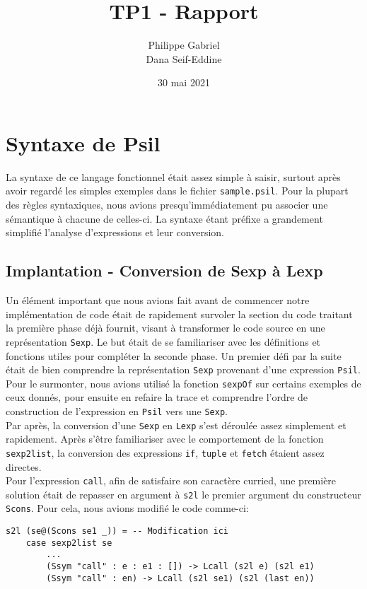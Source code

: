 \documentclass[11pt, titlepage]{article}
\begin{document}
\title{{\Huge \textbf{TP1 - Rapport}}}
\author{Philippe Gabriel \\ Dana Seif-Eddine}
\date{30 mai 2021}

\onehalfspacing

\maketitle

\setcounter{page}{2}

\newpage

\section{Syntaxe de Psil}

La syntaxe de ce langage fonctionnel était assez simple à saisir, surtout
après avoir regardé les simples exemples dans le fichier \texttt{sample.psil}.
Pour la plupart des règles syntaxiques, nous avions presqu'immédiatement pu
associer une sémantique à chacune de celles-ci. La syntaxe étant préfixe a
grandement simplifié l'analyse d'expressions et leur conversion.

\subsection{Implantation - Conversion de Sexp à Lexp}

Un élément important que nous avions fait avant de commencer notre
implémentation de code était de rapidement survoler la section du code traitant
la première phase déjà fournit, visant à transformer le code source en une
représentation \texttt{Sexp}. Le but était de se familiariser avec les
définitions et fonctions utiles pour compléter la seconde phase. Un premier
défi par la suite était de bien comprendre la représentation \texttt{Sexp}
provenant d'une expression \texttt{Psil}. Pour le surmonter, nous avions
utilisé la fonction \texttt{sexpOf} sur certains exemples de ceux donnés, pour
ensuite en refaire la trace et comprendre l'ordre de construction de
l'expression en \texttt{Psil} vers une \texttt{Sexp}. \\

Par après, la conversion d'une \texttt{Sexp} en \texttt{Lexp} s'est déroulée
assez simplement et rapidement. Après s'être familiariser avec le comportement
de la fonction \texttt{sexp2list}, la conversion des expressions \texttt{if},
\texttt{tuple} et \texttt{fetch} étaient assez directes. \\
Pour l'expression \texttt{call}, afin de satisfaire son caractère curried, une
première solution était de repasser en argument à \texttt{s2l} le premier
argument du constructeur \texttt{Scons}. Pour cela, nous avions modifié le code
comme-ci:
\begin{lstlisting}
s2l (se@(Scons se1 _)) = -- Modification ici
    case sexp2list se
        ...
        (Ssym "call" : e : e1 : []) -> Lcall (s2l e) (s2l e1)
        (Ssym "call" : en) -> Lcall (s2l se1) (s2l (last en))
\end{lstlisting}
\end{document}
